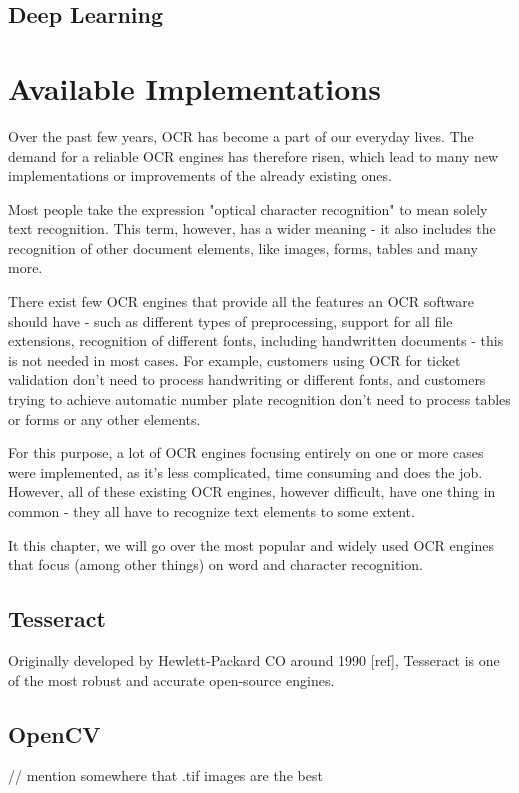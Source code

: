 \subsection{Deep Learning}

\section{Available Implementations}

Over the past few years, OCR has become a part of our everyday lives. The demand for a reliable OCR engines has therefore risen, which lead to many new implementations or improvements of the already existing ones.

Most people take the expression "optical character recognition" to mean solely text recognition. This term, however, has a wider meaning - it also includes the recognition of other document elements, like images, forms, tables and many more.

There exist few OCR engines that provide all the features an OCR software should have - such as different types of preprocessing, support for all file extensions, recognition of different fonts, including handwritten documents - this is not needed in most cases. For example, customers using OCR for ticket validation don't need to process handwriting or different fonts, and customers trying to achieve automatic number plate recognition don't need to process tables or forms or any other elements.

For this purpose, a lot of OCR engines focusing entirely on one or more cases were implemented, as it's less complicated, time consuming and does the job. However, all of these existing OCR engines, however difficult, have one thing in common - they all have to recognize text elements to some extent.

It this chapter, we will go over the most popular and widely used OCR engines that focus (among other things) on word and character recognition.

\subsection{Tesseract}

Originally developed by Hewlett-Packard CO around 1990 [ref], Tesseract is one of the most robust and accurate open-source engines.


\subsection{OpenCV}


// mention somewhere that .tif images are the best